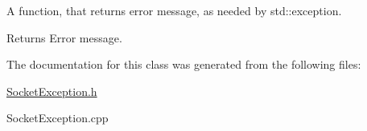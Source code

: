 A function, that returns error message, as needed by std\-::exception. 

\begin{DoxyReturn}{Returns}
Error message. 
\end{DoxyReturn}


The documentation for this class was generated from the following files\-:\begin{DoxyCompactItemize}
\item 
\hyperlink{_socket_exception_8h}{Socket\-Exception.\-h}\item 
Socket\-Exception.\-cpp\end{DoxyCompactItemize}
